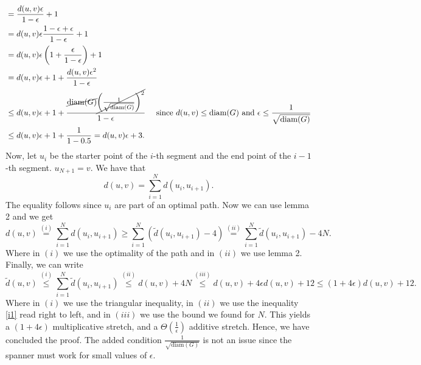 \documentclass[11pt]{article}
\begin{document}
\begin{enumerate}
\begin{align*}
          & = \frac{d(u,v)\epsilon}{1 - \epsilon} + 1\\
          &=  d(u,v)\epsilon \frac{1-\epsilon+\epsilon}{1-\epsilon} + 1 \\
          &= d(u,v)\epsilon \left(1+\frac{\epsilon}{1-\epsilon}\right) + 1\\
          &= d(u,v)\epsilon + 1 + \frac{ d(u,v)\epsilon^2}{1-\epsilon}\\
          &\leq d(u,v)\epsilon + 1 + \frac{ \cancel{\text{diam}(G)}\cancel{\left(\frac{1}{\sqrt{\text{diam}(G)}}\right)^2}}{1-\epsilon}&\text{ since $d(u,v) \leq \text{diam}(G)$ and }\epsilon \leq \frac{1}{\sqrt{\text{diam}(G)}}\\
          & \leq d(u,v)\epsilon + 1 + \frac{1}{1-0.5} = d(u,v)\epsilon + 3.
    \end{align*}
    Now, let $u_i$ be the starter point of the $i$-th segment and the end point of the $i-1$-th segment. $u_{N+1} = v$. We have that
    \begin{equation*}
        d(u,v) = \sum_{i = 1}^N d(u_i, u_{i+1}).
    \end{equation*}
    The equality follows since $u_i$ are part of an optimal path. Now we can use lemma 2 and we get
    \begin{equation*}
        d(u,v) \stackrel{(i)}{=} \sum_{i = 1}^N d(u_i, u_{i+1}) \geq \sum_{i = 1}^N (\tilde d(u_i, u_{i+1})-4) \stackrel{(ii)}{=} \sum_{i = 1}^N \tilde d(u_i, u_{i+1}) - 4N.
    \end{equation*}
    Where in $(i)$ we use the optimality of the path and in $(ii)$ we use lemma 2. Finally, we can write
    \begin{equation}\label{i1}
        \tilde d(u, v) \stackrel{(i)}{\leq} \sum_{i = 1}^N \tilde d(u_i, u_{i+1}) \stackrel{(ii)}{\leq} d(u,v) + 4N \stackrel{(iii)}{\leq} d(u,v) + 4\epsilon d(u,v) + 12 \leq (1+4\epsilon)d(u,v) + 12.
    \end{equation}
    Where in $(i)$ we use the triangular inequality, in $(ii)$ we use the inequality \ref{i1} read right to left, and in $(iii)$ we use the bound we found for $N$. This yields a $(1+4\epsilon)$ multiplicative stretch, and a $\Theta\left(\frac{1}{\epsilon}\right)$ additive stretch. Hence, we have concluded the proof. The added condition $\frac{1}{\sqrt{\text{diam}(G)}}$ is not an issue since the spanner must work for small values of $\epsilon$.
\end{enumerate}
    
\end{document}
